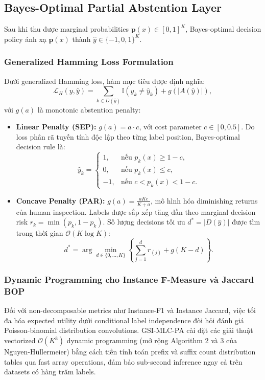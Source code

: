 \documentclass[conference]{IEEEtran}
\begin{document}
\subsection{Bayes-Optimal Partial Abstention Layer}
Sau khi thu được marginal probabilities $\mathbf{p}(x) \in [0, 1]^K$, Bayes-optimal decision policy ánh xạ $\mathbf{p}(x)$ thành $\hat{y} \in \{-1, 0, 1\}^K$.

\subsubsection{Generalized Hamming Loss Formulation}
Dưới generalized Hamming loss, hàm mục tiêu được định nghĩa:
\begin{equation}
    \mathcal{L}_H(y, \hat{y}) = \sum_{k \in D(\hat{y})} \mathbb{I}(y_k \neq \hat{y}_k) + g(|A(\hat{y})|),
\end{equation}
với $g(a)$ là monotonic abstention penalty:
\begin{itemize}
    \item \textbf{Linear Penalty (SEP):} $g(a) = a \cdot c$, với cost parameter $c \in [0, 0.5]$. Do loss phân rã tuyến tính độc lập theo từng label position, Bayes-optimal decision rule là:
    \begin{equation}
        \hat{y}_k = \begin{cases}
            1, & \text{nếu } p_k(x) \ge 1 - c, \\
            0, & \text{nếu } p_k(x) \le c, \\
            -1, & \text{nếu } c < p_k(x) < 1 - c.
        \end{cases}
    \end{equation}
    \item \textbf{Concave Penalty (PAR):} $g(a) = \frac{a K c}{K + a}$, mô hình hóa diminishing returns của human inspection. Labels được sắp xếp tăng dần theo marginal decision risk $r_k = \min(p_k, 1 - p_k)$. Số lượng decisions tối ưu $d^* = |D(\hat{y})|$ được tìm trong thời gian $\mathcal{O}(K \log K)$:
    \begin{equation}
        d^* = \arg\min_{d \in \{0, \dots, K\}} \left\{ \sum_{j=1}^d r_{(j)} + g(K - d) \right\}.
    \end{equation}
\end{itemize}

\subsubsection{Dynamic Programming cho Instance F-Measure và Jaccard BOP}
Đối với non-decomposable metrics như Instance-F1 và Instance Jaccard, việc tối đa hóa expected utility dưới conditional label independence đòi hỏi đánh giá Poisson-binomial distribution convolutions. GSI-MLC-PA cài đặt các giải thuật vectorized $\mathcal{O}(K^3)$ dynamic programming (mở rộng Algorithm 2 và 3 của Nguyen-H\"ullermeier) bằng cách tiền tính toán prefix và suffix count distribution tables qua fast array operations, đảm bảo sub-second inference ngay cả trên datasets có hàng trăm labels.
\end{document}
